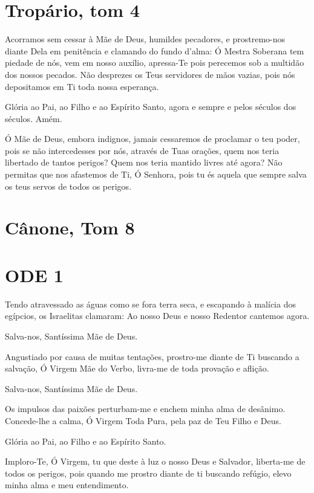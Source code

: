 \documentclass{subfiles}
\begin{document}

\section*{Tropário, tom 4}

Acorramos sem cessar à Mãe de Deus, humildes pecadores, e prostremo-nos diante
Dela em penitência e clamando do fundo d'alma: Ó Mestra Soberana tem piedade de
nós, vem em nosso auxílio, apressa-Te pois perecemos sob a multidão dos nossos
pecados. Não desprezes os Teus servidores de mãos vazias, pois nós depositamos
em Ti toda nossa esperança. 

Glória ao Pai, ao Filho e ao Espírito Santo, agora e sempre e pelos
séculos dos séculos. Amém.

Ó Mãe de Deus, embora indignos, jamais cessaremos de proclamar o
teu poder, pois se não intercedesses por nós, através de Tuas orações, quem
nos teria libertado de tantos perigos? Quem nos teria mantido livres até
agora? Não permitas que nos afastemos de Ti, Ó Senhora, pois tu és aquela
que sempre salva os teus servos de todos os perigos.

\section*{Cânone, Tom 8}

\section*{ODE 1}

\eirmos{}Tendo atravessado as águas como se fora terra seca, e
escapando à malícia dos egípcios, os Israelitas clamaram: Ao nosso Deus e
nosso Redentor cantemos agora.

Salva-nos, Santíssima Mãe de Deus.

Angustiado por causa de muitas tentações, prostro-me diante de Ti
buscando a salvação, Ó Virgem Mãe do Verbo, livra-me de toda provação e
aflição.

Salva-nos, Santíssima Mãe de Deus.

Os impulsos das paixões perturbam-me e enchem minha alma de
desânimo. Concede-lhe a calma, Ó Virgem Toda Pura, pela paz de Teu Filho e
Deus.

Glória ao Pai, ao Filho e ao Espírito Santo.

Imploro-Te, Ó Virgem, tu que deste à luz o nosso Deus e Salvador,
liberta-me de todos os perigos, pois quando me prostro diante de ti buscando
refúgio, elevo minha alma e meu entendimento.
\end{document}
